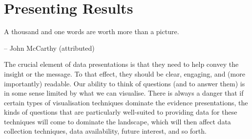 \section{Presenting Results}
\begin{tcolorbox}[title=... and the Yang]
A thousand and one words are worth more than a picture.\\[-0.6cm]
\begin{flushright}
-- John McCarthy (attributed)
\end{flushright}
\end{tcolorbox}\noindent
The crucial element of data presentations is that they need to help convey the insight or the message. To that effect, they should be clear, engaging, and (more importantly) readable. Our ability to think of questions (and to answer them) is in some sense limited by what we can visualise. There is always a danger that if certain types of visualisation techniques dominate the evidence presentations, the kinds of questions that are particularly well-suited to providing data for these techniques will come to dominate the landscape, which will then affect data collection techniques, data availability, future interest, and so forth.
